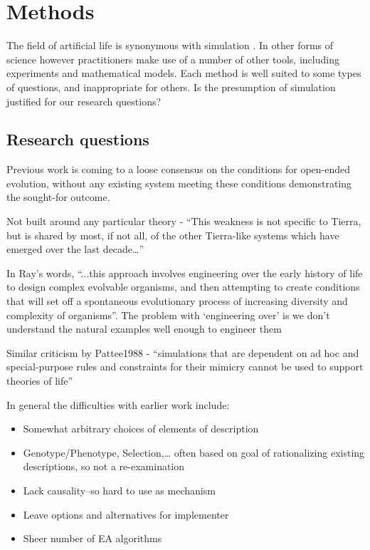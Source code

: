 \chapter{Methods}\label{methods}

The field of artificial life is synonymous with simulation \parencite[chap.2]{Aicardi2010}. In other forms of science however practitioners make use of a number of other tools, including experiments and mathematical models. Each method is well suited to some types of questions, and inappropriate for others. Is the presumption of simulation justified for our research questions?

\section{Research questions}\label{research-questions}

Previous work is coming to a loose consensus on the conditions for open-ended evolution, without any existing system meeting these conditions demonstrating the sought-for outcome.

Not built around any particular theory - ``This weakness is not specific to Tierra, but is shared by most, if not all, of the other Tierra-like systems which have emerged over the last decade\ldots{}''\parencite{Taylor2001}

In Ray's words, ``...this approach involves engineering over the early history of life to design complex evolvable organisms, and then attempting to create conditions that will set off a spontaneous evolutionary process of increasing diversity and complexity of organisms''\parencite{Taylor2001}. The problem with `engineering over' is we don't understand the natural examples well enough to engineer them \parencite{Taylor2001}

Similar criticism by Pattee1988 - ``simulations that are dependent on ad hoc and special-purpose rules and constraints for their mimicry cannot be used to support theories of life'' \parencite{Taylor2001}

In general the difficulties with earlier work include:
\begin{itemize}
	\item Somewhat arbitrary choices of elements of description
	\item Genotype/Phenotype, Selection,\ldots{} often based on goal of rationalizing existing descriptions, so not a re-examination
	\item Lack causality--so hard to use as mechanism
	\item Leave options and alternatives for implementer
	\item Sheer number of EA algorithms
\end{itemize}

